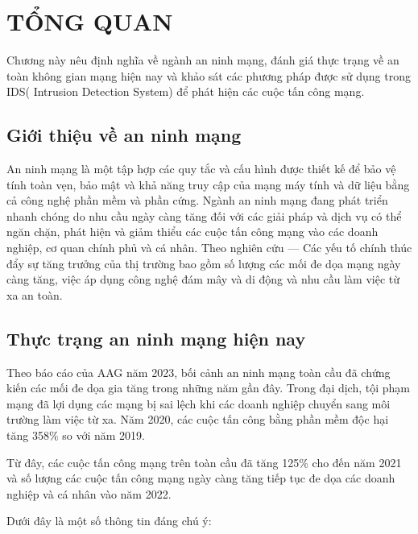 \chapter{TỔNG QUAN}

Chương này nêu định nghĩa về ngành an ninh mạng,
đánh giá thực trạng về an toàn không gian mạng hiện nay và
khảo sát các phương pháp được sử dụng trong IDS( Intrusion Detection System)
để phát hiện các cuộc tấn công mạng.

\section{Giới thiệu về an ninh mạng}

An ninh mạng là một tập hợp các quy tắc và cấu hình được thiết kế để
bảo vệ tính toàn vẹn, bảo mật và khả năng truy cập của mạng máy tính
và dữ liệu bằng cả công nghệ phần mềm và phần cứng. Ngành an ninh mạng
đang phát triển nhanh chóng do nhu cầu ngày càng tăng đối với các giải
pháp và dịch vụ có thể ngăn chặn, phát hiện và giảm thiểu các cuộc tấn
công mạng vào các doanh nghiệp, cơ quan chính phủ và cá nhân. Theo nghiên cứu ---
Các yếu tố chính thúc đẩy sự tăng trưởng của thị trường bao gồm số lượng các
mối đe dọa mạng ngày càng tăng, việc áp dụng công nghệ đám mây và di
động và nhu cầu làm việc từ xa an toàn.


\section{Thực trạng an ninh mạng hiện nay}

Theo báo cáo của AAG\cite{survey2023} năm 2023,
bối cảnh an ninh mạng toàn cầu đã chứng kiến các mối đe
dọa gia tăng trong những năm gần đây. Trong đại dịch,
tội phạm mạng đã lợi dụng các mạng bị sai lệch khi các
doanh nghiệp chuyển sang môi trường làm việc từ xa.
Năm 2020, các cuộc tấn công bằng phần mềm độc hại tăng 358\% so
với năm 2019.

Từ đây, các cuộc tấn công mạng trên toàn cầu đã tăng 125\% cho
đến năm 2021 và số lượng các cuộc tấn công mạng ngày càng tăng
tiếp tục đe dọa các doanh nghiệp và cá nhân vào năm 2022.

Dưới đây là một số thông tin đáng chú ý:


